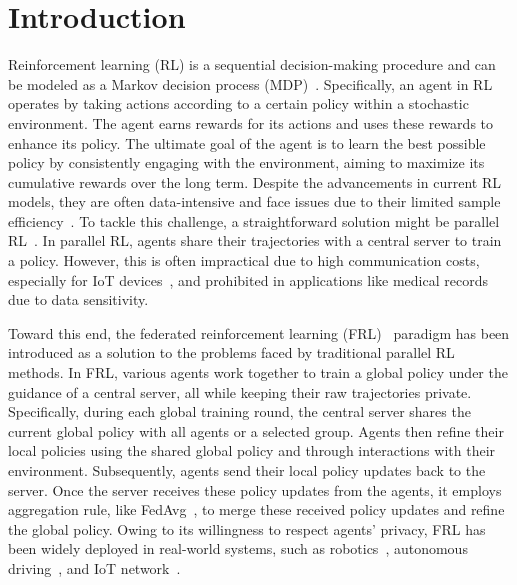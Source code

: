 
\section{Introduction} \label{sec:intro}

Reinforcement learning (RL) is a sequential decision-making procedure and can be modeled as a Markov decision process (MDP)~\cite{sutton2018reinforcement}.
Specifically, an agent in RL operates by taking actions according to a certain policy within a stochastic environment. The agent earns rewards for its actions and uses these rewards to enhance its policy. The ultimate goal of the agent is to learn the best possible policy by consistently engaging with the environment, aiming to maximize its cumulative rewards over the long term.
%
%
Despite the advancements in current RL models, they are often data-intensive and face issues due to their limited sample efficiency~\cite{dulac2021challenges,fan2021fault}.  
To tackle this challenge, a straightforward solution might be parallel RL~\cite{nair2015massively,mnih2016asynchronous}.
%
%
In parallel RL, agents share their trajectories with a central server to train a policy. However, this is often impractical due to high communication costs, especially for IoT devices~\cite{wang2020federated}, and prohibited in applications like medical records~\cite{liu2020reinforcement} due to data sensitivity.



Toward this end, the federated reinforcement learning (FRL)~\cite{fan2021fault,khodadadian2022federated,jin2022federated,liu2019lifelong,gao2024federated,yuan2023federated} paradigm has been introduced as a solution to the problems faced by traditional parallel RL methods. In FRL, various agents work together to train a global policy under the guidance of a central server, all while keeping their raw trajectories private.
Specifically, during each global training round, the central server shares the current global policy with all agents or a selected group. Agents then refine their local policies using the shared global policy and through interactions with their environment. Subsequently, agents send their local policy updates back to the server. Once the server receives these policy updates from the agents, it employs aggregation rule, like FedAvg~\cite{mcmahan2017communication}, to merge these received policy updates and refine the global policy.
%
Owing to its willingness to respect agents' privacy, FRL has been widely deployed in real-world systems, such as robotics~\cite{kober2013reinforcement}, autonomous driving~\cite{liang2022federated}, and IoT network~\cite{wang2020federated}.





